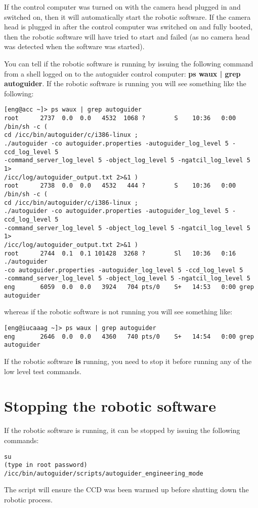 \documentclass[10pt,a4paper]{article}
\begin{document}
If the control computer was turned on with the camera head plugged in and switched on, then it will automatically start the robotic software. If the camera head is plugged in after the control computer was switched on and fully booted, then the robotic software will have tried to start and failed (as no camera head was detected when the software was started).

You can tell if the robotic software is running by issuing the following command from a shell logged on to the autoguider control computer: {\bf ps waux | grep autoguider}. If the robotic software is running you will see something like the following:
\begin{verbatim}
[eng@acc ~]> ps waux | grep autoguider
root      2737  0.0  0.0   4532  1068 ?        S    10:36   0:00 /bin/sh -c ( 
cd /icc/bin/autoguider/c/i386-linux ; 
./autoguider -co autoguider.properties -autoguider_log_level 5 -ccd_log_level 5 
-command_server_log_level 5 -object_log_level 5 -ngatcil_log_level 5 1> 
/icc/log/autoguider_output.txt 2>&1 )
root      2738  0.0  0.0   4532   444 ?        S    10:36   0:00 /bin/sh -c ( 
cd /icc/bin/autoguider/c/i386-linux ; 
./autoguider -co autoguider.properties -autoguider_log_level 5 -ccd_log_level 5 
-command_server_log_level 5 -object_log_level 5 -ngatcil_log_level 5 1> 
/icc/log/autoguider_output.txt 2>&1 )
root      2744  0.1  0.1 101428  3268 ?        Sl   10:36   0:16 ./autoguider 
-co autoguider.properties -autoguider_log_level 5 -ccd_log_level 5 
-command_server_log_level 5 -object_log_level 5 -ngatcil_log_level 5
eng       6059  0.0  0.0   3924   704 pts/0    S+   14:53   0:00 grep autoguider
\end{verbatim}
whereas if the robotic software is not running you will see something like:
\begin{verbatim}
[eng@iucaaag ~]> ps waux | grep autoguider
eng       2646  0.0  0.0   4360   740 pts/0    S+   14:54   0:00 grep autoguider
\end{verbatim}

If the robotic software {\bf is} running, you need to stop it before running any of the low level test commands.

\section{Stopping the robotic software}
\label{sec:engineering_mode}

If the robotic software is running, it can be stopped by issuing the following commands:
\begin{verbatim}
su
(type in root password)
/icc/bin/autoguider/scripts/autoguider_engineering_mode
\end{verbatim}
The script will ensure the CCD was been warmed up before shutting down the robotic process.
\end{document}
